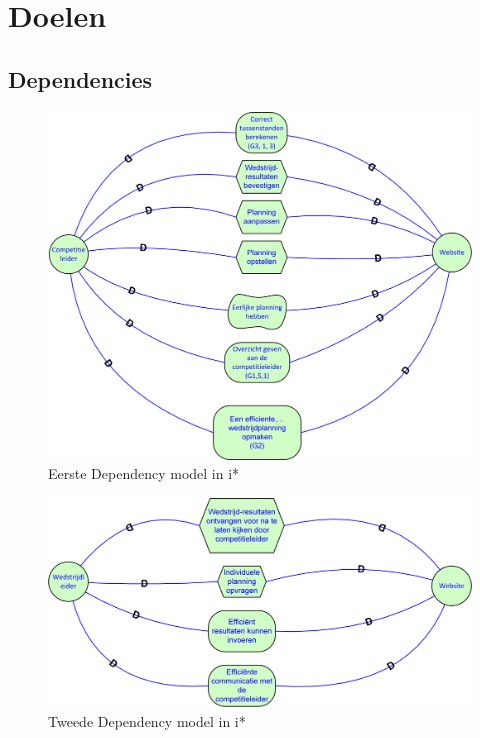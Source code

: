 \documentclass[12pt,a4paper]{article}
\begin{document}
		\section{Doelen}
			\subsection{Dependencies}
			\begin{figure}[H]
			\includegraphics[width=\textwidth]{../2-Doelen/istar1.png}
			\caption{Eerste Dependency model in i*}
			\end{figure}
			\begin{figure}[H]
				\includegraphics[width=\textwidth]{../2-Doelen/istar2.png}
				\caption{Tweede Dependency model in i*}
			\end{figure}
\end{document}

